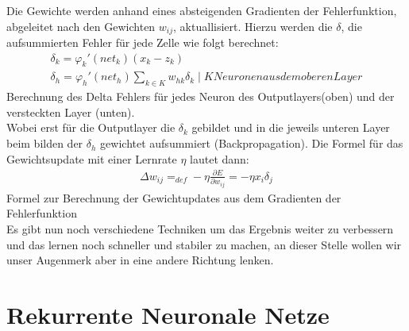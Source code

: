 Die Gewichte werden anhand eines absteigenden Gradienten der Fehlerfunktion, abgeleitet nach den Gewichten \(w_{ij}\), aktuallisiert.  Hierzu werden die \(\delta\), die aufsummierten Fehler für jede Zelle wie folgt berechnet: 
\begin{gather}
\delta_{k} = \varphi_{k}'(net_{k})(x_{k}-z_{k}) \\
\delta_{h} = \varphi_{h}'(net_{h})\sum_{k\in K}w_{hk}\delta_{k} \mid K Neuronen aus dem oberen Layer 
\label{eq:err}
\end{gather}
Berechnung des Delta Fehlers für jedes Neuron des Outputlayers(oben) und der versteckten Layer (unten). \\
Wobei erst für die Outputlayer die \(\delta_{k}\) gebildet und in die jeweils unteren Layer beim bilden der \(\delta_{h}\) gewichtet aufsummiert (Backpropagation). Die Formel für das Gewichtsupdate mit einer Lernrate \(\eta\) lautet dann:
\begin{gather}	
	\Delta w_{ij} =_{def}  -\eta \frac{\partial E}{\partial w_{ij}} = -\eta x_{i}\delta_{j}  
\end{gather} 
Formel zur Berechnung der Gewichtupdates aus dem Gradienten der Fehlerfunktion \cite{bib:bp}\\
Es gibt nun noch verschiedene Techniken um das Ergebnis weiter zu verbessern und das lernen noch schneller und stabiler zu machen, an dieser Stelle wollen wir unser Augenmerk aber in eine andere Richtung lenken. 
\section{Rekurrente Neuronale Netze}

